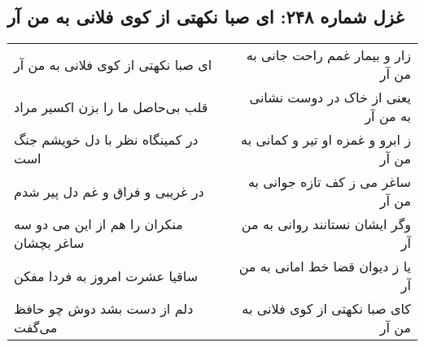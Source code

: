 \begin{center}
\section*{غزل شماره ۲۴۸: ای صبا نکهتی از کوی فلانی به من آر}
\label{sec:sh248}
\begin{longtable}{l p{0.5cm} r}
ای صبا نکهتی از کوی فلانی به من آر
&&
زار و بیمار غمم راحت جانی به من آر
\\
قلب بی‌حاصل ما را بزن اکسیر مراد
&&
یعنی از خاک در دوست نشانی به من آر
\\
در کمینگاه نظر با دل خویشم جنگ است
&&
ز ابرو و غمزه او تیر و کمانی به من آر
\\
در غریبی و فراق و غم دل پیر شدم
&&
ساغر می ز کف تازه جوانی به من آر
\\
منکران را هم از این می دو سه ساغر بچشان
&&
وگر ایشان نستانند روانی به من آر
\\
ساقیا عشرت امروز به فردا مفکن
&&
یا ز دیوان قضا خط امانی به من آر
\\
دلم از دست بشد دوش چو حافظ می‌گفت
&&
کای صبا نکهتی از کوی فلانی به من آر
\\
\end{longtable}
\end{center}
